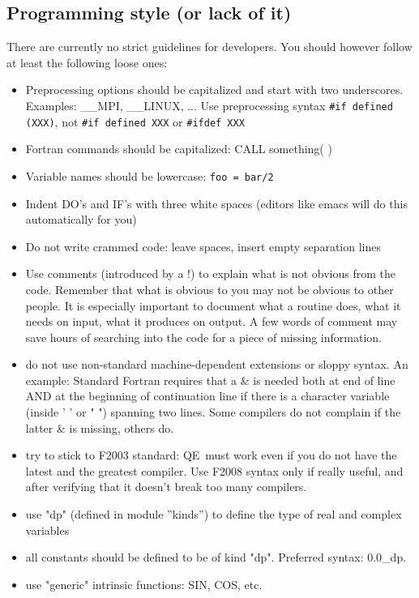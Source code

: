 \documentclass[12pt,a4paper]{article}
\def\qe{QE}
\begin{document}
\subsection{Programming style (or lack of it)}

There are currently no strict guidelines for developers. You
should however follow at least the following loose ones:
\begin{itemize}
\item Preprocessing options should be capitalized and start with
two underscores. Examples: \_\_MPI, \_\_LINUX, ... Use 
preprocessing syntax \verb|#if defined (XXX)|, not \verb|#if defined XXX|
or \verb|#ifdef XXX|
\item Fortran commands should be capitalized:
CALL something( )
\item Variable names should be lowercase: \texttt{foo = bar/2}
\item Indent DO's and IF's with three white spaces (editors like emacs will do this automatically for you)
\item Do not write crammed code: leave spaces, insert empty separation lines
\item Use comments (introduced by a !) to explain what is not obvious from
the code. Remember that what is obvious to you may not be obvious to other
people. It is especially important to document what a routine does, what
it needs on input, what it produces on output. A few words of comment
may save hours of searching into the code for a piece of missing information.
\item do not use non-standard machine-dependent extensions or sloppy syntax.
  An example: Standard Fortran requires that a \& is needed both at end of
  line AND at the beginning of continuation line if there is a character
  variable (inside ' ' or " ") spanning two lines. Some compilers do not
  complain if the latter \& is missing, others do.
\item try to stick to F2003 standard: \qe\ must work even if you do not have 
      the latest and the greatest compiler. Use F2008 syntax only if really
      useful, and after verifying that it doesn't break too many compilers.
\item use "dp" (defined in module ''kinds'') to define the type of real and
  complex variables
\item all constants should be defined to be of kind "dp".  Preferred syntax:
  0.0\_dp.
\item use "generic" intrinsic functions: SIN, COS, etc.

\end{itemize}
\end{document}
